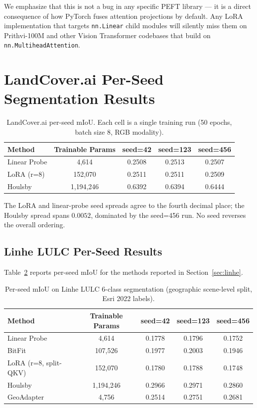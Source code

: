 \documentclass[11pt]{article}
\begin{document}
We emphasize that this is not a bug in any specific PEFT library --- it is a direct consequence of how PyTorch fuses attention projections by default. Any LoRA implementation that targets \texttt{nn.Linear} child modules will silently miss them on Prithvi-100M and other Vision Transformer codebases that build on \texttt{nn.MultiheadAttention}.

\section{LandCover.ai Per-Seed Segmentation Results}
\label{app:seg-per-seed}

\begin{table}[h]
\centering
\small
\caption{LandCover.ai per-seed mIoU. Each cell is a single training run (50 epochs, batch size 8, RGB modality).}
\label{tab:landcoverai-per-seed}
\begin{tabular}{lcccc}
\toprule
Method & Trainable Params & seed=42 & seed=123 & seed=456 \\
\midrule
Linear Probe & 4{,}614       & 0.2508 & 0.2513 & 0.2507 \\
LoRA (r=8)   & 152{,}070     & 0.2511 & 0.2511 & 0.2509 \\
Houlsby      & 1{,}194{,}246 & 0.6392 & 0.6394 & 0.6444 \\
\bottomrule
\end{tabular}
\end{table}

The LoRA and linear-probe seed spreads agree to the fourth decimal place; the Houlsby spread spans $0.0052$, dominated by the seed=456 run. No seed reverses the overall ordering.

\subsection{Linhe LULC Per-Seed Results}
\label{app:linhe-perseed}

Table~\ref{tab:linhe-perseed} reports per-seed mIoU for the methods reported in Section~\ref{sec:linhe}.

\begin{table}[h]
\centering
\small
\caption{Per-seed mIoU on Linhe LULC 6-class segmentation (geographic scene-level split, Esri 2022 labels).}
\label{tab:linhe-perseed}
\begin{tabular}{lcccc}
\toprule
Method & Trainable Params & seed=42 & seed=123 & seed=456 \\
\midrule
Linear Probe & 4{,}614       & 0.1778 & 0.1796 & 0.1752 \\
BitFit       & 107{,}526     & 0.1977 & 0.2003 & 0.1946 \\
LoRA (r=8, split-QKV) & 152{,}070 & 0.1780 & 0.1788 & 0.1748 \\
Houlsby      & 1{,}194{,}246 & 0.2966 & 0.2971 & 0.2860 \\
GeoAdapter   & 4{,}756       & 0.2514 & 0.2751 & 0.2681 \\
\bottomrule
\end{tabular}
\end{table}
\end{document}
